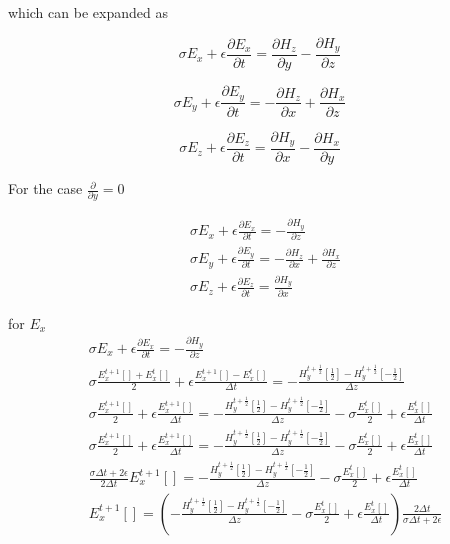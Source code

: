which can be expanded as

\begin{equation}
\sigma  E_{x} + \epsilon \frac{\partial  E_{x}}{\partial t} = \frac{\partial  H_{z}}{\partial y}-\frac{\partial  H_{y}}{\partial z}
\end{equation}

\begin{equation}
\sigma  E_{y} + \epsilon \frac{\partial  E_{y}}{\partial t} = -\frac{\partial  H_{z}}{\partial x}+\frac{\partial  H_{x}}{\partial z}
\end{equation}

\begin{equation}
\sigma  E_{z} + \epsilon \frac{\partial  E_{z}}{\partial t} = \frac{\partial  H_{y}}{\partial x}-\frac{\partial  H_{x}}{\partial y}
\end{equation}


For the case $\frac{\partial}{\partial y}=0$

\begin{equation}
\begin{split}
&\sigma  E_{x} + \epsilon \frac{\partial  E_{x}}{\partial t} =-\frac{\partial  H_{y}}{\partial z}\\
&\sigma  E_{y} + \epsilon \frac{\partial  E_{y}}{\partial t} = -\frac{\partial  H_{z}}{\partial x}+\frac{\partial  H_{x}}{\partial z}\\
&\sigma  E_{z} + \epsilon \frac{\partial  E_{z}}{\partial t} = \frac{\partial  H_{y}}{\partial x}
\end{split}
\end{equation}

for $E_{x}$
\begin{equation}
\begin{split}
&\sigma  E_{x} + \epsilon \frac{\partial  E_{x}}{\partial t} =-\frac{\partial  H_{y}}{\partial z}\\
&\sigma  \frac{E_{x}^{t+1}[]+E_{x}^{t}[]}{2} + \epsilon \frac{E_{x}^{t+1}[]-E_{x}^{t}[]}{\Delta t} = -\frac{H_{y}^{t+\frac{1}{2}}[\frac{1}{2}]-H_{y}^{t+\frac{1}{2}}[-\frac{1}{2}]}{\Delta z}\\
&\sigma  \frac{E_{x}^{t+1}[]}{2} + \epsilon \frac{E_{x}^{t+1}[]}{\Delta t} = -\frac{H_{y}^{t+\frac{1}{2}}[\frac{1}{2}]-H_{y}^{t+\frac{1}{2}}[-\frac{1}{2}]}{\Delta z}-\sigma  \frac{E_{x}^{t}[]}{2}+\epsilon \frac{E_{x}^{t}[]}{\Delta t}\\
&\sigma  \frac{E_{x}^{t+1}[]}{2} + \epsilon \frac{E_{x}^{t+1}[]}{\Delta t} = -\frac{H_{y}^{t+\frac{1}{2}}[\frac{1}{2}]-H_{y}^{t+\frac{1}{2}}[-\frac{1}{2}]}{\Delta z}-\sigma  \frac{E_{x}^{t}[]}{2}+\epsilon \frac{E_{x}^{t}[]}{\Delta t}\\
& \frac{\sigma \Delta t  + 2 \epsilon  }{ 2 \Delta t}E_{x}^{t+1}[] = -\frac{H_{y}^{t+\frac{1}{2}}[\frac{1}{2}]-H_{y}^{t+\frac{1}{2}}[-\frac{1}{2}]}{\Delta z}-\sigma  \frac{E_{x}^{t}[]}{2}+\epsilon \frac{E_{x}^{t}[]}{\Delta t}\\
& E_{x}^{t+1}[] = \left ( -\frac{H_{y}^{t+\frac{1}{2}}[\frac{1}{2}]-H_{y}^{t+\frac{1}{2}}[-\frac{1}{2}]}{\Delta z}-\sigma  \frac{E_{x}^{t}[]}{2}+\epsilon \frac{E_{x}^{t}[]}{\Delta t} \right ) \frac{2 \Delta t}{\sigma \Delta t  + 2 \epsilon}
\end{split}
\end{equation}

